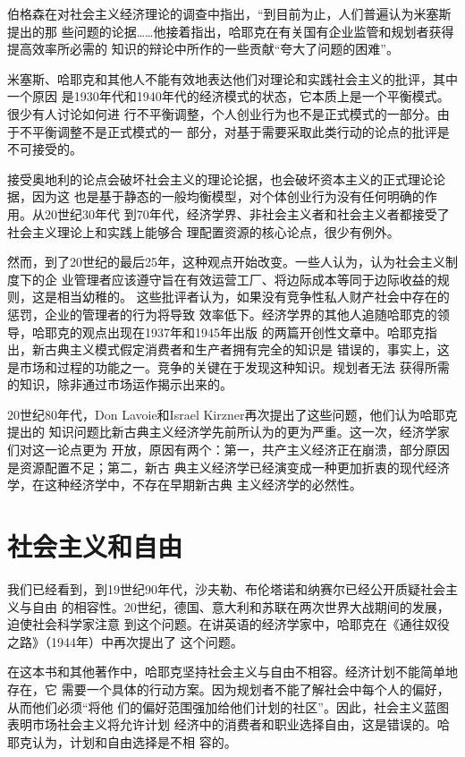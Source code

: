 伯格森在对社会主义经济理论的调查中指出，“到目前为止，人们普遍认为米塞斯提出的那
些问题的论据……他接着指出，哈耶克在有关国有企业监管和规划者获得提高效率所必需的
知识的辩论中所作的一些贡献“夸大了问题的困难”。

米塞斯、哈耶克和其他人不能有效地表达他们对理论和实践社会主义的批评，其中一个原因
是1930年代和1940年代的经济模式的状态，它本质上是一个平衡模式。很少有人讨论如何进
行不平衡调整，个人创业行为也不是正式模式的一部分。由于不平衡调整不是正式模式的一
部分，对基于需要采取此类行动的论点的批评是不可接受的。

接受奥地利的论点会破坏社会主义的理论论据，也会破坏资本主义的正式理论论据，因为这
也是基于静态的一般均衡模型，对个体创业行为没有任何明确的作用。从20世纪30年代
到70年代，经济学界、非社会主义者和社会主义者都接受了社会主义理论上和实践上能够合
理配置资源的核心论点，很少有例外。

然而，到了20世纪的最后25年，这种观点开始改变。一些人认为，认为社会主义制度下的企
业管理者应该遵守旨在有效运营工厂、将边际成本等同于边际收益的规则，这是相当幼稚的。
这些批评者认为，如果没有竞争性私人财产社会中存在的惩罚，企业的管理者的行为将导致
效率低下。经济学界的其他人追随哈耶克的领导，哈耶克的观点出现在1937年和1945年出版
的两篇开创性文章中。哈耶克指出，新古典主义模式假定消费者和生产者拥有完全的知识是
错误的，事实上，这是市场和过程的功能之一。竞争的关键在于发现这种知识。规划者无法
获得所需的知识，除非通过市场运作揭示出来的。

20世纪80年代，Don Lavoie和Israel Kirzner再次提出了这些问题，他们认为哈耶克提出的
知识问题比新古典主义经济学先前所认为的更为严重。这一次，经济学家们对这一论点更为
开放，原因有两个：第一，共产主义经济正在崩溃，部分原因是资源配置不足；第二，新古
典主义经济学已经演变成一种更加折衷的现代经济学，在这种经济学中，不存在早期新古典
主义经济学的必然性。

\clearpage
\section{社会主义和自由}

我们已经看到，到19世纪90年代，沙夫勒、布伦塔诺和纳赛尔已经公开质疑社会主义与自由
的相容性。20世纪，德国、意大利和苏联在两次世界大战期间的发展，迫使社会科学家注意
到这个问题。在讲英语的经济学家中，哈耶克在《通往奴役之路》（1944年）中再次提出了
这个问题。


在这本书和其他著作中，哈耶克坚持社会主义与自由不相容。经济计划不能简单地存在，它
需要一个具体的行动方案。因为规划者不能了解社会中每个人的偏好，从而他们必须“将他
们的偏好范围强加给他们计划的社区”。因此，社会主义蓝图表明市场社会主义将允许计划
经济中的消费者和职业选择自由，这是错误的。哈耶克认为，计划和自由选择是不相
容的。

